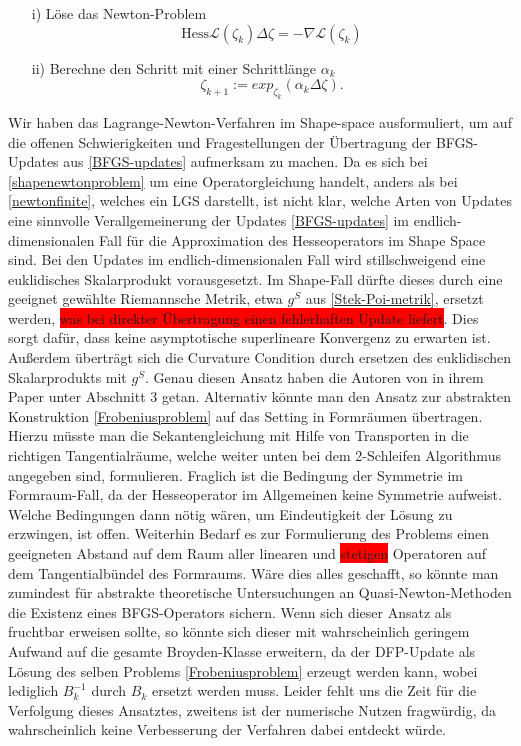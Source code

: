 \begin{itemize}
	\item[i)] Löse das Newton-Problem \\
	\begin{equation}\label{shapenewtonproblem}
	\text{Hess}\mathcal{L}(\zeta_k)\Delta \zeta = - \nabla \mathcal{L}(\zeta_k)
	\end{equation}
	\item[ii)] Berechne den Schritt mit einer Schrittlänge $\alpha_k$
	\begin{equation}
	\zeta_{k+1} := exp_{\zeta_k}(\alpha_k \Delta \zeta).
	\end{equation}
\end{itemize}
Wir haben das Lagrange-Newton-Verfahren im Shape-space ausformuliert, um auf die offenen Schwierigkeiten und Fragestellungen der Übertragung der BFGS-Updates aus \ref{BFGS-updates} aufmerksam zu machen. Da es sich bei 
\ref{shapenewtonproblem} um eine Operatorgleichung handelt, anders als bei \ref{newtonfinite}, welches ein LGS darstellt, ist nicht klar, welche Arten von Updates eine sinnvolle Verallgemeinerung der Updates \ref{BFGS-updates} im endlich-dimensionalen Fall für die Approximation des Hesseoperators im Shape Space sind. Bei den Updates im endlich-dimensionalen Fall wird stillschweigend eine euklidisches Skalarprodukt vorausgesetzt. Im Shape-Fall dürfte dieses durch eine geeignet gewählte Riemannsche Metrik, etwa $g^S$ aus \ref{Stek-Poi-metrik}, ersetzt werden, \colorbox{red}{was bei direkter Übertragung einen fehlerhaften Update liefert}. Dies sorgt dafür, dass keine asymptotische superlineare Konvergenz zu erwarten ist. Außerdem überträgt sich die Curvature Condition durch ersetzen des euklidischen Skalarprodukts mit $g^S$. Genau diesen Ansatz haben die Autoren von \cite{diffusion} in ihrem Paper unter Abschnitt 3 getan. Alternativ könnte man den Ansatz zur abstrakten Konstruktion \ref{Frobeniusproblem} auf das Setting in Formräumen übertragen. Hierzu müsste man die Sekantengleichung mit Hilfe von Transporten in die richtigen Tangentialräume, welche weiter unten bei dem 2-Schleifen Algorithmus angegeben sind, formulieren. Fraglich ist die Bedingung der Symmetrie im Formraum-Fall, da der Hesseoperator im Allgemeinen keine Symmetrie aufweist. Welche Bedingungen dann nötig wären, um Eindeutigkeit der Lösung zu erzwingen, ist offen. Weiterhin Bedarf es zur Formulierung des Problems einen geeigneten Abstand auf dem Raum aller linearen und \colorbox{red}{stetigen} Operatoren auf dem Tangentialbündel des Formraums. Wäre dies alles geschafft, so könnte man zumindest für abstrakte theoretische Untersuchungen an Quasi-Newton-Methoden die Existenz eines BFGS-Operators sichern. Wenn sich dieser Ansatz als fruchtbar erweisen sollte, so könnte sich dieser mit wahrscheinlich geringem Aufwand auf die gesamte Broyden-Klasse erweitern, da der DFP-Update als Lösung des selben Problems \ref{Frobeniusproblem} erzeugt werden kann, wobei lediglich $B_k^{-1}$ durch $B_k$ ersetzt werden muss. Leider fehlt uns die Zeit für die Verfolgung dieses Ansatztes, zweitens ist der numerische Nutzen fragwürdig, da wahrscheinlich keine Verbesserung der Verfahren dabei entdeckt würde. 

